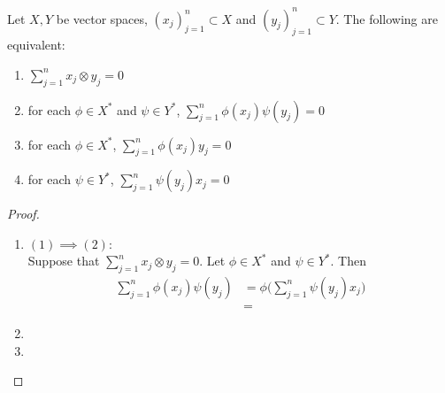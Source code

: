 \documentclass{book}
\begin{document}
\begin{ex}
	Let $X,Y$ be vector spaces, $(x_j)_{j=1}^n \subset X$ and $(y_j)_{j=1}^n \subset Y$. The following are equivalent:
	\begin{enumerate}
		\item $\sum\limits_{j=1}^n  x_j \otimes y_j = 0$
		\item for each $\phi \in X^*$ and $\psi \in Y^*$, $\sum\limits_{j=1}^n  \phi(x_j) \psi(y_j) = 0$
		\item for each $\phi \in X^*$, $\sum\limits_{j=1}^n  \phi(x_j)  y_j = 0$
		\item for each $\psi \in Y^*$, $\sum\limits_{j=1}^n  \psi(y_j) x_j = 0$
	\end{enumerate}
\end{ex}

\begin{proof}\
	\begin{enumerate}
		\item $(1) \implies (2):$ \\
		Suppose that $\sum\limits_{j=1}^n x_j \otimes y_j = 0$. Let $\phi \in X^*$ and $\psi \in Y^*$. Then 
		\begin{align*}
			\sum\limits_{j=1}^n  \phi(x_j) \psi(y_j)
			& = \phi \bigg( \sum\limits_{j=1}^n \psi(y_j) x_j \bigg) \\
			& = 
		\end{align*}
		\item 
		\item 
	\end{enumerate}
\end{proof}
\end{document}
